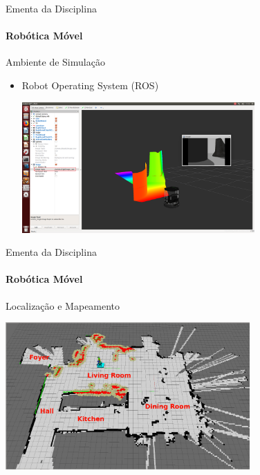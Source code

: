 \documentclass{beamer}
\begin{document}
\begin{frame}[t]{Ementa da Disciplina}
	\framesubtitle{Robótica Móvel}
	\begin{block}{Ambiente de Simulação}
	\end{block}

	\begin{itemize}
		\item  Robot Operating System (ROS)
		\begin{center}
			\includegraphics[width=0.7\textwidth]{../images/ros_example_2.png}	
		\end{center}
	\end{itemize}
\end{frame}



\begin{frame}[c]{Ementa da Disciplina}
	\framesubtitle{Robótica Móvel}
	\begin{block}{Localização e Mapeamento}
	\end{block}
	\begin{center}
		\includegraphics[width=0.7\textwidth]{../images/slam-example.png}	
	\end{center}
\end{frame}
\end{document}
